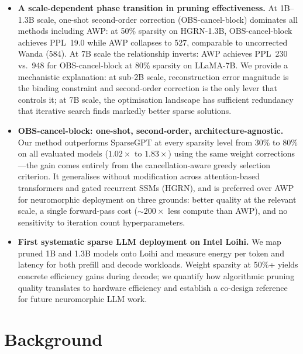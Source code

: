 \documentclass{article}
\begin{document}
\begin{itemize}
  \item \textbf{A scale-dependent phase transition in pruning effectiveness.}
        At 1B--1.3B scale, one-shot second-order correction (OBS-cancel-block)
        dominates all methods including AWP: at 50\% sparsity on HGRN-1.3B,
        OBS-cancel-block achieves PPL~19.0 while AWP collapses to 527,
        comparable to uncorrected Wanda (584). At 7B scale the relationship
        inverts: AWP achieves PPL~230 vs.\ 948 for OBS-cancel-block at 80\%
        sparsity on LLaMA-7B. We provide a mechanistic explanation: at
        sub-2B scale, reconstruction error magnitude is the binding constraint
        and second-order correction is the only lever that controls it;
        at 7B scale, the optimisation landscape has sufficient redundancy
        that iterative search finds markedly better sparse solutions.

  \item \textbf{OBS-cancel-block: one-shot, second-order, architecture-agnostic.}
        Our method outperforms SparseGPT at every sparsity level from 30\% to
        80\% on all evaluated models ($1.02\times$ to $1.83\times$) using the
        same weight corrections---the gain comes entirely from the
        cancellation-aware greedy selection criterion. It generalises without
        modification across attention-based transformers and gated recurrent
        SSMs (HGRN), and is preferred over AWP for neuromorphic deployment on
        three grounds: better quality at the relevant scale, a single
        forward-pass cost (${\sim}200\times$ less compute than AWP), and
        no sensitivity to iteration count hyperparameters.

  \item \textbf{First systematic sparse LLM deployment on Intel Loihi.}
        We map pruned 1B and 1.3B models onto Loihi and measure energy per
        token and latency for both prefill and decode workloads. Weight
        sparsity at 50\%+ yields concrete efficiency gains during decode;
        we quantify how algorithmic pruning quality translates to
        hardware efficiency and establish a co-design reference for
        future neuromorphic LLM work.
\end{itemize}


\section{Background}
\label{sec:background}
\end{document}
